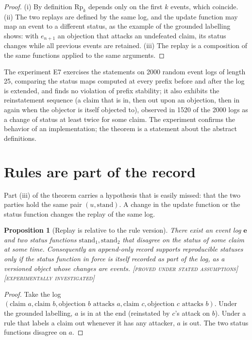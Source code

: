 \documentclass[11pt,twoside,openright]{book}
\theoremstyle{plain}
\newtheorem{proposition}[theorem]{Proposition}
\theoremstyle{definition}
\theoremstyle{remark}
\newcommand{\Proved}{\textup{\textsc{[proved under stated assumptions]}}}
\newcommand{\Tested}{\textup{\textsc{[experimentally investigated]}}}
\begin{document}
\begin{proof}
(i) By definition $\mathrm{Rp}_k$ depends only on the first $k$ events, which coincide. (ii) The two replays are defined by the same log, and the update function may map an event to a different status, as the example of the grounded labelling shows: with $e_{n+1}$ an objection that attacks an undefeated claim, its status changes while all previous events are retained. (iii) The replay is a composition of the same functions applied to the same arguments.
\end{proof}

The experiment E7 exercises the statements on 2000 random event logs of length 25, comparing the status maps computed at every prefix before and after the log is extended, and finds no violation of prefix stability; it also exhibits the reinstatement sequence (a claim that is in, then out upon an objection, then in again when the objector is itself objected to), observed in 1520 of the 2000 logs as a change of status at least twice for some claim. The experiment confirms the behavior of an implementation; the theorem is a statement about the abstract definitions.

\section{Rules are part of the record}

Part (iii) of the theorem carries a hypothesis that is easily missed: that the two parties hold the same pair $(u,\mathrm{stand})$. A change in the update function or the status function changes the replay of the same log.

\begin{proposition}[Replay is relative to the rule version]\label{prop:ruleversion}
There exist an event log $\mathbf{e}$ and two status functions $\mathrm{stand}_1,\mathrm{stand}_2$ that disagree on the status of some claim at some time. Consequently an append-only record supports reproducible statuses only if the status function in force is itself recorded as part of the log, as a versioned object whose changes are events.
\Proved{} \Tested{}
\end{proposition}

\begin{proof}
Take the log $(\text{claim }a,\text{claim }b,\text{objection }b\text{ attacks }a,\text{claim }c,\text{objection }c\text{ attacks }b)$. Under the grounded labelling, $a$ is in at the end (reinstated by $c$'s attack on $b$). Under a rule that labels a claim out whenever it has any attacker, $a$ is out. The two status functions disagree on $a$.
\end{proof}
\end{document}

